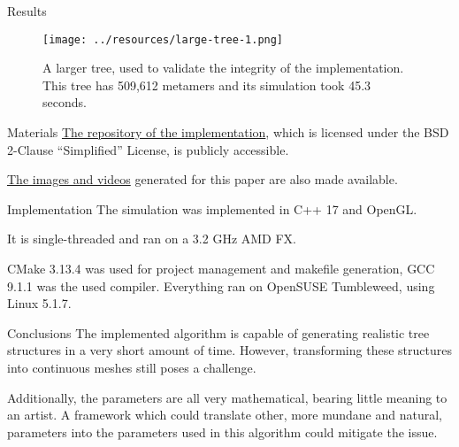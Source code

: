 \documentclass{beamer}
\begin{document}
\begin{frame}{Results}
\begin{figure}[H]
\centering
\texttt{[image: ../resources/large-tree-1.png]}
\caption{A larger tree, used to validate the integrity of the implementation. This tree has 509,612 metamers and its simulation took 45.3 seconds.}
\end{figure}
\end{frame}


\begin{frame}{Materials}
\href{https://github.com/bernardosulzbach/self-organizing-tree-models}{The repository of the implementation}, which is licensed under the BSD 2-Clause ``Simplified'' License, is publicly accessible.

\href{https://inf.ufrgs.br/~bsulzbach/share/computer-graphics/}{The images and videos} generated for this paper are also made available.
\end{frame}


\begin{frame}{Implementation}
The simulation was implemented in C++ 17 and OpenGL.

It is single-threaded and ran on a 3.2 GHz AMD FX.

CMake 3.13.4 was used for project management and makefile generation, GCC 9.1.1 was the used compiler.
Everything ran on OpenSUSE Tumbleweed, using Linux 5.1.7.
\end{frame}


\begin{frame}{Conclusions}
The implemented algorithm is capable of generating realistic tree structures in a very short amount of time. However, transforming these structures into continuous meshes still poses a challenge.

Additionally, the parameters are all very mathematical, bearing little meaning to an artist.
A framework which could translate other, more mundane and natural, parameters into the parameters used in this algorithm could mitigate the issue.
\end{frame}
\end{document}
